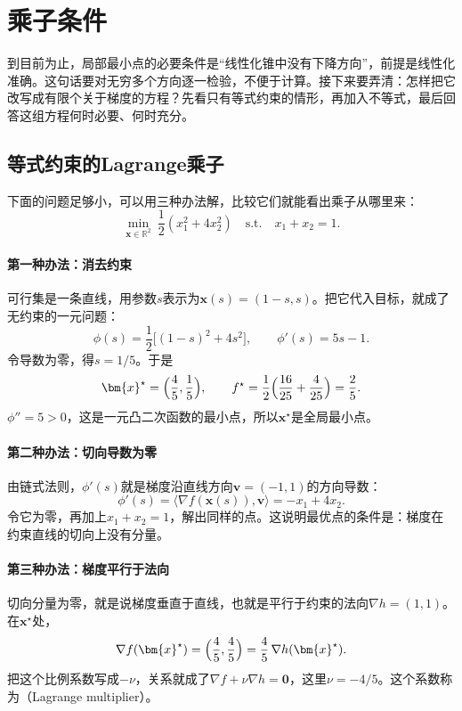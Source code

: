 \section{乘子条件}
\label{sec:kkt-multipliers}

到目前为止，局部最小点的必要条件是“线性化锥中没有下降方向”，前提是线性化准确。这句话要对无穷多个方向逐一检验，不便于计算。接下来要弄清：怎样把它改写成有限个关于梯度的方程？先看只有等式约束的情形，再加入不等式，最后回答这组方程何时必要、何时充分。

\subsection{等式约束的Lagrange乘子}
\label{sec:kkt-lagrange}

下面的问题足够小，可以用三种办法解，比较它们就能看出乘子从哪里来：
\begin{equation}
 \min_{\bm{x}\in\mathbb{R}^2}\ \frac12(x_1^2+4x_2^2)\quad\text{s.t.}\quad x_1+x_2=1.
 \label{eq:kkt-equality-qp}
\end{equation}

\paragraph{第一种办法：消去约束}
可行集是一条直线，用参数$s$表示为$\bm{x}(s)=(1-s,s)$。把它代入目标，就成了无约束的一元问题：
\[
 \phi(s)=\frac12\bigl[(1-s)^2+4s^2\bigr],\qquad\phi'(s)=5s-1.
\]
令导数为零，得$s=1/5$。于是
\[
 \bm{x}^\star=\Bigl(\frac45,\frac15\Bigr),\qquad f^\star=\frac12\Bigl(\frac{16}{25}+\frac{4}{25}\Bigr)=\frac25.
\]
$\phi''=5>0$，这是一元凸二次函数的最小点，所以$\bm{x}^\star$是全局最小点。

\paragraph{第二种办法：切向导数为零}
由链式法则，$\phi'(s)$就是梯度沿直线方向$\bm{v}=(-1,1)$的方向导数：
\[
 \phi'(s)=\langle\nabla f(\bm{x}(s)),\bm{v}\rangle=-x_1+4x_2.
\]
令它为零，再加上$x_1+x_2=1$，解出同样的点。这说明最优点的条件是：梯度在约束直线的切向上没有分量。

\paragraph{第三种办法：梯度平行于法向}
切向分量为零，就是说梯度垂直于直线，也就是平行于约束的法向$\nabla h=(1,1)$。在$\bm{x}^\star$处，
\[
 \nabla f(\bm{x}^\star)=\Bigl(\frac45,\frac45\Bigr)=\frac45\,\nabla h(\bm{x}^\star).
\]
把这个比例系数写成$-\nu$，关系就成了$\nabla f+\nu\nabla h=\bm{0}$，这里$\nu=-4/5$。这个系数称为（Lagrange multiplier）。


